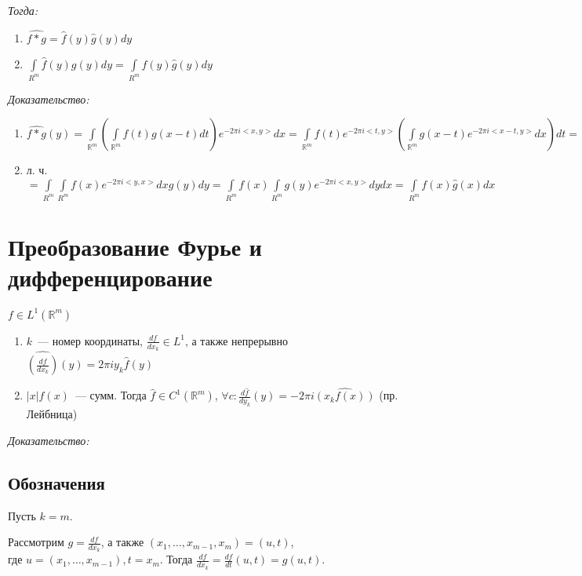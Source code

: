 \documentclass[paper=a4, fontsize=17pt]{article}
\begin{document}
	\emph{Тогда:}
	\begin{enumerate}
		\item $ \widehat{f \ast g} = \widehat{f}(y)\widehat{g}(y) dy$
		\item $ \int\limits_{R^m} \widehat{f}(y)g(y) dy = \int\limits_{R^m} f(y)\widehat{g}(y) dy $
	\end{enumerate}
	\emph{Доказательство:}
	\begin{enumerate}
		\item $ \widehat{f \ast g}(y)
		= \int\limits_{\mathbb{R}^m}(\int\limits_{\mathbb{R}^m} f(t) g(x - t) dt) e^{-2 \pi i <x, y>}dx = \int\limits_{\mathbb{R}^m} f(t) e^{-2 \pi i <t, y>}(\int\limits_{\mathbb{R}^m} g(x - t) e^{-2 \pi i <x - t, y>} dx) dt = \int\limits_{\mathbb{R}^m} f(t) e^{-2 \pi i <t, y>} \widehat{g}(y) dt = \widehat{f}(y) \cdot \widehat{g}(y)$

		\item л. ч.
		$ = \int\limits_{R^m} \int\limits_{R^m} f(x) e^{-2\pi i <y, x>} dx g(y) dy
		= \int\limits_{R^m} f(x) \int\limits_{R^m} g(y) e^{-2\pi i <x, y>} dy  dx = \int\limits_{R^m}f(x)\widehat{g}(x) dx$
	\end{enumerate}

\section{Преобразование Фурье и дифференцирование}

$f \in L^1(\mathds{R}^m)$
\begin{enumerate}
	\item $k$~--- номер координаты, $\frac{df}{dx_k} \in L^1$, а также непрерывно $ \widehat{(\frac{df}{dx_k})}(y) = 2\pi i y_k \hat{f}(y)$
	\item $|x|f(x)$~--- сумм. Тогда $\hat{f} \in C^1(\mathds{R}^m)$, $\forall c : \frac{d\hat{f}}{dy_k}(y) = -2\pi i \widehat{(x_k f(x))}$ (пр. Лейбница)
\end{enumerate}

\emph{Доказательство:}

\subsection{Обозначения}

Пусть $k=m$.

Рассмотрим $g = \frac{df}{dx_k}$, а также $(x_1, \ldots, x_{m-1}, x_m) = (u, t)$,\\
где $u = (x_1, \ldots, x_{m-1}), t = x_m$. Тогда $\frac{df}{dx_k} = \frac{df}{dt}(u, t) = g(u, t)$.
\end{document}
